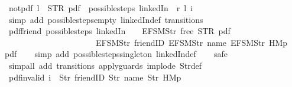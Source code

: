 \begin{isabellebody}
\endisatagproof
{\isafoldproof}%
%
\isadelimproof
\isanewline
%
\endisadelimproof
\isanewline
{}\isamarkupfalse%
\ not{\isacharunderscore}pdf{\isacharunderscore}{}{\isacharcolon}\ {\isachardoublequoteopen}l\ {\isasymnoteq}\ STR\ {\isacharprime}{\isacharprime}pdf{\isacharprime}{\isacharprime}\ {\isasymLongrightarrow}\ possible{\isacharunderscore}steps\ linkedIn\ {}\ r\ l\ i\ {\isacharequal}\ {\isacharbraceleft}{\isacharbar}{\isacharbar}{\isacharbraceright}{\isachardoublequoteclose}\isanewline
%
\isadelimproof
\ \ %
\endisadelimproof
%
\isatagproof
{}\isamarkupfalse%
\ {\isacharparenleft}simp\ add{\isacharcolon}\ possible{\isacharunderscore}steps{\isacharunderscore}empty\ linkedIn{\isacharunderscore}def\ transitions{\isacharparenright}%
\endisatagproof
{\isafoldproof}%
%
\isadelimproof
\isanewline
%
\endisadelimproof
\isanewline
{}\isamarkupfalse%
\ pdf{\isacharunderscore}friend{\isacharcolon}\ {\isachardoublequoteopen}possible{\isacharunderscore}steps\ linkedIn\ {}\ {\isacharless}{}\ {\isacharcolon}{\isacharequal}\ EFSM{\isachardot}Str\ {\isacharprime}{\isacharprime}free{\isacharprime}{\isacharprime}{\isachargreater}\ STR\ {\isacharprime}{\isacharprime}pdf{\isacharprime}{\isacharprime}\isanewline
\ \ \ \ \ \ \ \ \ \ \ \ \ \ \ \ \ \ \ \ \ \ {\isacharbrackleft}EFSM{\isachardot}Str\ {\isacharprime}{\isacharprime}friendID{\isacharprime}{\isacharprime}{\isacharcomma}\ EFSM{\isachardot}Str\ {\isacharprime}{\isacharprime}name{\isacharprime}{\isacharprime}{\isacharcomma}\ EFSM{\isachardot}Str\ {\isacharprime}{\isacharprime}HM{}p{\isacharprime}{\isacharprime}{\isacharbrackright}\ {\isacharequal}\ {\isacharbraceleft}{\isacharbar}{\isacharparenleft}{}{\isacharcomma}\ pdf{\isacharparenright}{\isacharbar}{\isacharbraceright}{\isachardoublequoteclose}\isanewline
%
\isadelimproof
\ \ %
\endisadelimproof
%
\isatagproof
{}\isamarkupfalse%
\ {\isacharparenleft}simp\ add{\isacharcolon}\ possible{\isacharunderscore}steps{\isacharunderscore}singleton\ linkedIn{\isacharunderscore}def{\isacharparenright}\isanewline
\ \ \isamarkupfalse%
\ safe\isanewline
\ \ \isamarkupfalse%
\ {\isacharparenleft}simp{\isacharunderscore}all\ add{\isacharcolon}\ transitions\ apply{\isacharunderscore}guards\ implode\ Str{\isacharunderscore}def{\isacharparenright}%
\endisatagproof
{\isafoldproof}%
%
\isadelimproof
\isanewline
%
\endisadelimproof
\isanewline
{}\isamarkupfalse%
\ pdf{\isacharunderscore}{}{\isacharunderscore}invalid{\isacharcolon}\ {\isachardoublequoteopen}i\ {\isasymnoteq}\ {\isacharbrackleft}Str\ {\isacharprime}{\isacharprime}friendID{\isacharprime}{\isacharprime}{\isacharcomma}\ Str\ {\isacharprime}{\isacharprime}name{\isacharprime}{\isacharprime}{\isacharcomma}\ Str\ {\isacharprime}{\isacharprime}HM{}p{\isacharprime}{\isacharprime}{\isacharbrackright}\ {\isasymLongrightarrow}\ \isanewline

\end{isabellebody}
